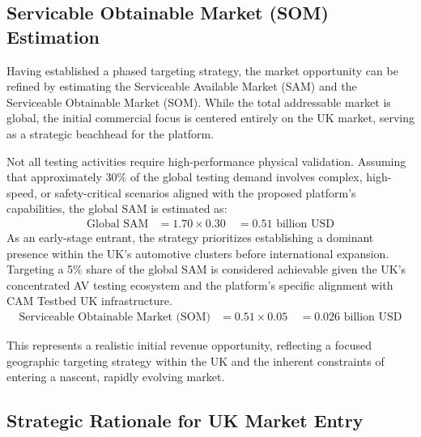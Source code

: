 \documentclass[11pt, a4paper]{report}
\numberwithin{equation}{section}
\begin{document}
\begin{refsection}
\subsection{Servicable Obtainable Market (SOM) Estimation}
\label{subsec:som_estimation}

Having established a phased targeting strategy, the market opportunity can be refined by estimating the Serviceable Available Market (SAM) and the Serviceable Obtainable Market (SOM). While the total addressable market is global, the initial commercial focus is centered entirely on the UK market, serving as a strategic beachhead for the platform.

Not all testing activities require high-performance physical validation. Assuming that approximately 30\% of the global testing demand involves complex, high-speed, or safety-critical scenarios aligned with the proposed platform’s capabilities, the global SAM is estimated as:
\vspace{-3pt}
\begin{equation}
\begin{aligned}
\text{Global SAM} &= 1.70 \times 0.30 \
&= 0.51 \text{ billion USD}
\end{aligned}
\end{equation}
\vspace{+4pt}
As an early-stage entrant, the strategy prioritizes establishing a dominant presence within the UK's automotive clusters before international expansion. Targeting a 5\% share of the global SAM is considered achievable given the UK's concentrated AV testing ecosystem and the platform's specific alignment with CAM Testbed UK infrastructure.
\begin{equation}
\begin{aligned}
\text{Serviceable Obtainable Market (SOM)} &= 0.51 \times 0.05 \
&= 0.026 \text{ billion USD}
\end{aligned}
\end{equation}
\vspace{-18pt}

This represents a realistic initial revenue opportunity, reflecting a focused geographic targeting strategy within the UK and the inherent constraints of entering a nascent, rapidly evolving market.

\subsection{Strategic Rationale for UK Market Entry}
\label{sec:uk_market}
\label{sec:ch6-uk-market-entry}


\end{refsection}
\end{document}
